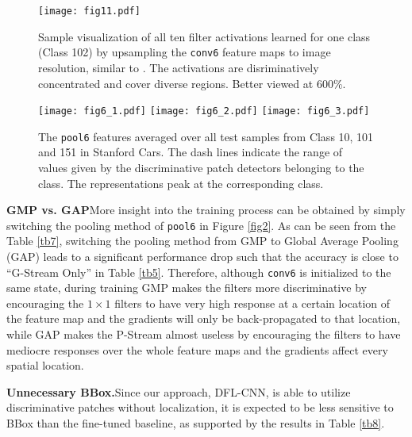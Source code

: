 \documentclass[10pt,twocolumn,letterpaper]{article}
\begin{document}
\begin{figure*}
\begin{minipage}{\textwidth}
\texttt{[image: fig11.pdf]}
\caption{\label{fig11} Sample visualization of all ten filter activations learned for one class (Class
102) by upsampling the \texttt{conv6} feature maps to image resolution, similar to \cite{bolei}. The activations are 
disriminatively concentrated and cover diverse regions. Better viewed at 600\%.}
\end{minipage}
\begin{minipage}{\textwidth}
\texttt{[image: fig6\_1.pdf]}
\texttt{[image: fig6\_2.pdf]}
\texttt{[image: fig6\_3.pdf]}
   \vspace{-10pt}
\caption{\label{fig6} The \texttt{pool6} features averaged over all test samples from Class 10,
101 and 151 in Stanford Cars. The dash lines indicate the range of values given by the discriminative patch detectors belonging to the
class. The representations peak at the corresponding class.}
   \vspace{-10pt}
\end{minipage}
\end{figure*}
\noindent\textbf{GMP vs. GAP}\quad More insight into the training process can be obtained by simply switching the pooling method
of \texttt{pool6} in Figure \ref{fig2}. As can be seen from the Table \ref{tb7}, switching the pooling method from
GMP to Global Average Pooling (GAP) leads to a significant performance drop such that the accuracy is
close to ``G-Stream Only'' in Table \ref{tb5}. Therefore, although
\texttt{conv6} is initialized to the same state, during training GMP makes the filters more discriminative by
encouraging the $1\times1$ filters to have very high response at a certain location of the feature map and the gradients
will only be back-propagated to that location, while GAP makes the P-Stream almost useless by encouraging the filters
to have mediocre responses over the whole feature maps and the gradients affect every spatial location.

\noindent\textbf{Unnecessary BBox.}\quad Since our approach, DFL-CNN, is able to utilize discriminative patches without
localization, it is expected to be less sensitive to BBox than the fine-tuned baseline, as supported by the
results in Table \ref{tb8}.
\end{document}
